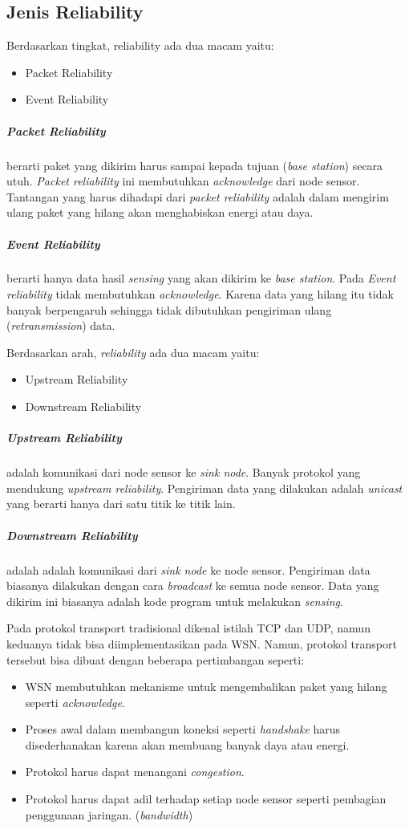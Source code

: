\subsection{Jenis Reliability}
Berdasarkan tingkat, reliability ada dua macam yaitu:
\begin{itemize}
	\item Packet Reliability
	\item Event Reliability
\end{itemize}  
\subparagraph{Packet Reliability} berarti paket yang dikirim harus sampai kepada tujuan (\textit{base station}) secara utuh. \textit{Packet reliability} ini membutuhkan \textit{acknowledge} dari node sensor. Tantangan yang harus dihadapi dari \textit{packet reliability} adalah dalam mengirim ulang paket yang hilang akan menghabiskan energi atau daya.
\subparagraph{Event Reliability} berarti hanya data hasil \textit{sensing} yang akan dikirim ke \textit{base station}. Pada \textit{Event reliability} tidak membutuhkan \textit{acknowledge}. Karena data yang hilang itu tidak banyak berpengaruh sehingga tidak dibutuhkan pengiriman ulang (\textit{retransmission}) data.

Berdasarkan arah, \textit{reliability} ada dua macam yaitu:
\begin{itemize}
	\item Upstream Reliability
	\item Downstream Reliability
\end{itemize}
\subparagraph{Upstream Reliability} adalah komunikasi dari node sensor ke \textit{sink node}. Banyak protokol yang mendukung \textit{upstream reliability}. Pengiriman data yang dilakukan adalah \textit{unicast} yang berarti hanya dari satu titik ke titik lain.
\subparagraph{Downstream Reliability} adalah adalah komunikasi dari \textit{sink node} ke node sensor. Pengiriman data biasanya dilakukan dengan cara \textit{broadcast} ke semua node sensor. Data yang dikirim ini biasanya adalah kode program untuk melakukan \textit{sensing}. 

Pada protokol transport tradisional dikenal istilah TCP dan UDP, namun keduanya tidak bisa diimplementasikan pada WSN. Namun, protokol transport tersebut bisa dibuat dengan beberapa pertimbangan seperti:
\begin{itemize}
	\item WSN membutuhkan mekanisme untuk mengembalikan paket yang hilang seperti \textit{acknowledge}.
	\item Proses awal dalam membangun koneksi seperti \textit{handshake} harus disederhanakan karena akan membuang banyak daya atau energi.
	\item Protokol harus dapat menangani \textit{congestion}.
	\item Protokol harus dapat adil terhadap setiap node sensor seperti pembagian penggunaan jaringan. (\textit{bandwidth})
\end{itemize} 

